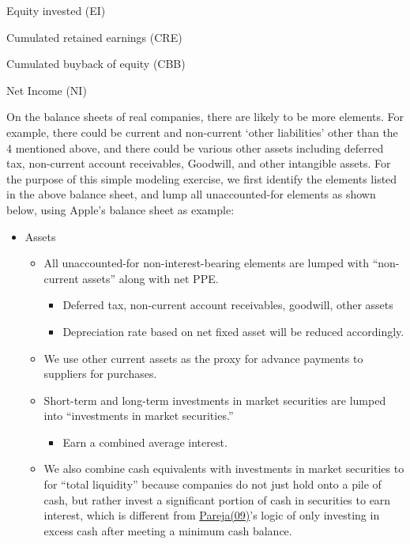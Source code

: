 \documentclass[12pt,a4paper]{article}
\begin{document}
Equity invested (EI)

Cumulated retained earnings (CRE)

Cumulated buyback of equity (CBB)

Net Income (NI)

On the balance sheets of real companies, there are likely to be more
elements. For example, there could be current and non-current `other
liabilities' other than the 4 mentioned above, and there could be
various other assets including deferred tax, non-current account
receivables, Goodwill, and other intangible assets. For the purpose of
this simple modeling exercise, we first identify the elements listed in
the above balance sheet, and lump all unaccounted-for elements as shown
below, using Apple's balance sheet as example:

\begin{itemize}
\item
  Assets

  \begin{itemize}
  \item
    All unaccounted-for non-interest-bearing elements are lumped with
    ``non-current assets'' along with net PPE.

    \begin{itemize}
    \item
      Deferred tax, non-current account receivables, goodwill, other
      assets
    \item
      Depreciation rate based on net fixed asset will be reduced
      accordingly.
    \end{itemize}
  \item
    We use other current assets as the proxy for advance payments to
    suppliers for purchases.
  \item
    Short-term and long-term investments in market securities are lumped
    into ``investments in market securities.''

    \begin{itemize}
    \item
      Earn a combined average interest.
    \end{itemize}
  \item
    We also combine cash equivalents with investments in market
    securities to for ``total liquidity'' because companies do not just
    hold onto a pile of cash, but rather invest a significant portion of
    cash in securities to earn interest, which is different from
    \hyperlink{ref:pareja09}{Pareja(09)}'s logic of only investing in excess cash after meeting a
    minimum cash balance.


\end{itemize}
\end{itemize}
\end{document}
